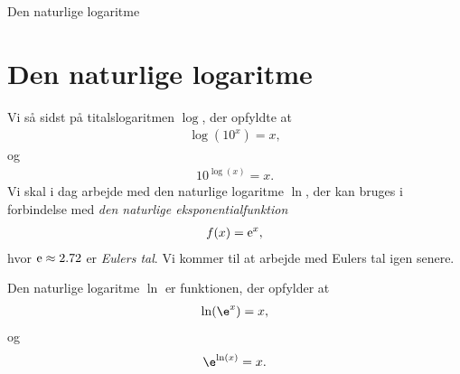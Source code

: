 
\begin{center}
\Huge
Den naturlige logaritme
\end{center}

\section*{Den naturlige logaritme}

Vi så sidst på titalslogaritmen $\log$, der opfyldte at 
\begin{align*}
	\log(10^x) = x,
\end{align*}
og
\begin{align*}
	10^{\log(x)} = x.
\end{align*}
Vi skal i dag arbejde med den naturlige logaritme $\ln$, der kan bruges i forbindelse med \textit{den naturlige eksponentialfunktion }
\begin{align*}
	f(x) = \textnormal{e}^x,
\end{align*}
hvor $\textnormal{e} \approx 2.72$ er \textit{Eulers tal}. Vi kommer til at arbejde med Eulers tal igen senere. 

\begin{defn}
	Den naturlige logaritme $\ln$ er funktionen, der opfylder at 
	\begin{align*}
		\ln(\e^x) = x,
	\end{align*}
	og 
	\begin{align*}
		\e^{\ln(x)} = x.
	\end{align*}
\end{defn}

